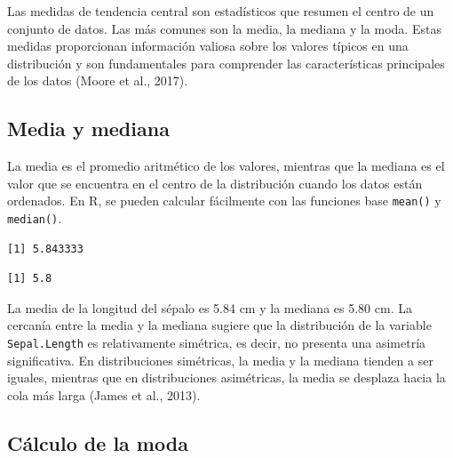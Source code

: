 \documentclass[
  spanish,
  a4paper,
  DIV=11,
  numbers=noendperiod,
  onepage,
  openany]{scrreprt}
\newenvironment{Shaded}{\begin{snugshade}}{\end{snugshade}}
\newcommand{\CommentTok}[1]{\textcolor[rgb]{0.37,0.37,0.37}{#1}}
\newcommand{\FunctionTok}[1]{\textcolor[rgb]{0.28,0.35,0.67}{#1}}
\newcommand{\NormalTok}[1]{\textcolor[rgb]{0.00,0.23,0.31}{#1}}
\newcommand{\SpecialCharTok}[1]{\textcolor[rgb]{0.37,0.37,0.37}{#1}}
\begin{document}
Las medidas de tendencia central son estadísticos que resumen el centro
de un conjunto de datos. Las más comunes son la media, la mediana y la
moda. Estas medidas proporcionan información valiosa sobre los valores
típicos en una distribución y son fundamentales para comprender las
características principales de los datos (Moore et al., 2017).

\subsection{Media y mediana}\label{media-y-mediana}

La media es el promedio aritmético de los valores, mientras que la
mediana es el valor que se encuentra en el centro de la distribución
cuando los datos están ordenados. En R, se pueden calcular fácilmente
con las funciones base \texttt{mean()} y \texttt{median()}.

\begin{Shaded}
\end{Shaded}

\begin{verbatim}
[1] 5.843333
\end{verbatim}

\begin{Shaded}
\end{Shaded}

\begin{verbatim}
[1] 5.8
\end{verbatim}

La media de la longitud del sépalo es 5.84 cm y la mediana es 5.80 cm.
La cercanía entre la media y la mediana sugiere que la distribución de
la variable \texttt{Sepal.Length} es relativamente simétrica, es decir,
no presenta una asimetría significativa. En distribuciones simétricas,
la media y la mediana tienden a ser iguales, mientras que en
distribuciones asimétricas, la media se desplaza hacia la cola más larga
(James et al., 2013).

\subsection{Cálculo de la moda}\label{cuxe1lculo-de-la-moda}
\end{document}
